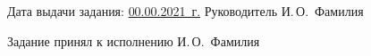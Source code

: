 {  \vspace{2em}

  Дата выдачи задания: \uline{00.00.2021~г.} \hspace{1.5ex} Руководитель \hfill{} \uline{\hspace*{4.5em}}  И.\,О.~Фамилия 

  \vspace{1em}
  Задание принял к исполнению \hfill{} \uline{\hspace*{4.5em}}  И.\,О.~Фамилия 

  \restoregeometry
}